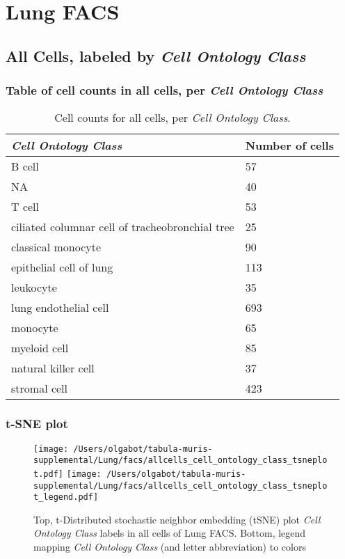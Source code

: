 \clearpage
\section{Lung FACS}

\subsection{All Cells, labeled by \emph{Cell Ontology Class}}
\subsubsection{Table of cell counts in all cells, per \emph{Cell Ontology Class}}\begin{table}[h]
\centering
\label{my-label}
\begin{tabular}{@{}ll@{}}
\toprule

\emph{Cell Ontology Class}& Number of cells \\ \midrule
B cell & 57 \\

NA & 40 \\

T cell & 53 \\

ciliated columnar cell of tracheobronchial tree & 25 \\

classical monocyte & 90 \\

epithelial cell of lung & 113 \\

leukocyte & 35 \\

lung endothelial cell & 693 \\

monocyte & 65 \\

myeloid cell & 85 \\

natural killer cell & 37 \\

stromal cell & 423 \\
\bottomrule
\end{tabular}
\caption{Cell counts for all cells, per \emph{Cell Ontology Class}.}
\end{table}

\clearpage
\subsubsection{t-SNE plot}
\begin{figure}[h]
\centering
\texttt{[image: /Users/olgabot/tabula-muris-supplemental/Lung/facs/allcells\_cell\_ontology\_class\_tsneplot.pdf]}
\texttt{[image: /Users/olgabot/tabula-muris-supplemental/Lung/facs/allcells\_cell\_ontology\_class\_tsneplot\_legend.pdf]}
\caption{Top, t-Distributed stochastic neighbor embedding (tSNE) plot  \emph{Cell Ontology Class} labels in all cells of Lung FACS. Bottom, legend mapping \emph{Cell Ontology Class} (and letter abbreviation) to colors}
\end{figure}


